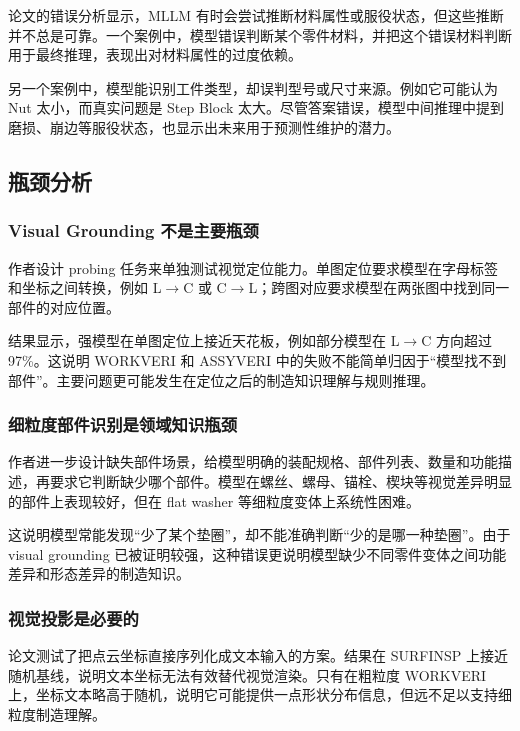 论文的错误分析显示，MLLM 有时会尝试推断材料属性或服役状态，但这些推断并不总是可靠。一个案例中，模型错误判断某个零件材料，并把这个错误材料判断用于最终推理，表现出对材料属性的过度依赖。

另一个案例中，模型能识别工件类型，却误判型号或尺寸来源。例如它可能认为 Nut 太小，而真实问题是 Step Block 太大。尽管答案错误，模型中间推理中提到磨损、崩边等服役状态，也显示出未来用于预测性维护的潜力。

\subsection{瓶颈分析}

\subsubsection{Visual Grounding 不是主要瓶颈}

作者设计 probing 任务来单独测试视觉定位能力。单图定位要求模型在字母标签和坐标之间转换，例如 L$\rightarrow$C 或 C$\rightarrow$L；跨图对应要求模型在两张图中找到同一部件的对应位置。

结果显示，强模型在单图定位上接近天花板，例如部分模型在 L$\rightarrow$C 方向超过 97\%。这说明 WORKVERI 和 ASSYVERI 中的失败不能简单归因于“模型找不到部件”。主要问题更可能发生在定位之后的制造知识理解与规则推理。

\subsubsection{细粒度部件识别是领域知识瓶颈}

作者进一步设计缺失部件场景，给模型明确的装配规格、部件列表、数量和功能描述，再要求它判断缺少哪个部件。模型在螺丝、螺母、锚栓、楔块等视觉差异明显的部件上表现较好，但在 flat washer 等细粒度变体上系统性困难。

这说明模型常能发现“少了某个垫圈”，却不能准确判断“少的是哪一种垫圈”。由于 visual grounding 已被证明较强，这种错误更说明模型缺少不同零件变体之间功能差异和形态差异的制造知识。

\subsubsection{视觉投影是必要的}

论文测试了把点云坐标直接序列化成文本输入的方案。结果在 SURFINSP 上接近随机基线，说明文本坐标无法有效替代视觉渲染。只有在粗粒度 WORKVERI 上，坐标文本略高于随机，说明它可能提供一点形状分布信息，但远不足以支持细粒度制造理解。

